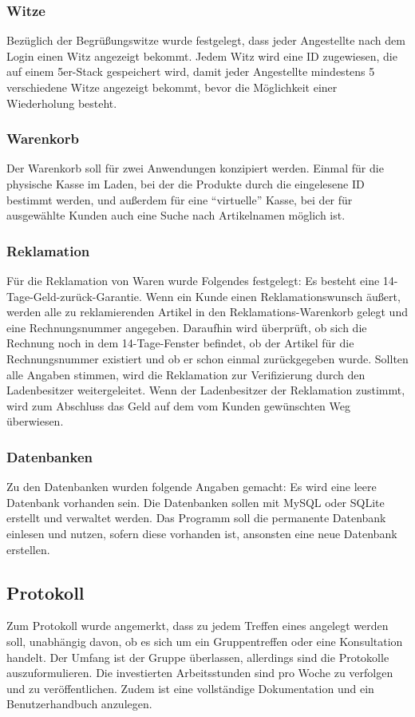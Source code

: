\documentclass{scrartcl}
\begin{document}
\subsubsection{Witze}
Bezüglich der Begrüßungswitze wurde festgelegt, dass jeder Angestellte nach dem Login einen Witz angezeigt bekommt. Jedem Witz wird eine ID zugewiesen, die auf einem 5er-Stack gespeichert wird, damit jeder Angestellte mindestens 5 verschiedene Witze angezeigt bekommt, bevor die Möglichkeit einer Wiederholung besteht.
\subsubsection{Warenkorb}
Der Warenkorb soll für zwei Anwendungen konzipiert werden. Einmal für die physische Kasse im Laden, bei der die Produkte durch die eingelesene ID bestimmt werden, und außerdem für eine "`virtuelle"' Kasse, bei der für ausgewählte Kunden auch eine Suche nach Artikelnamen möglich ist.
\subsubsection{Reklamation}
Für die Reklamation von Waren wurde Folgendes festgelegt: Es besteht eine 14-Tage-Geld-zurück-Garantie. Wenn ein Kunde einen Reklamationswunsch äußert, werden alle zu reklamierenden Artikel in den Reklamations-Warenkorb gelegt und eine Rechnungsnummer angegeben. Daraufhin wird überprüft, ob sich die Rechnung noch in dem 14-Tage-Fenster befindet, ob der Artikel für die Rechnungsnummer existiert und ob er schon einmal zurückgegeben wurde. Sollten alle Angaben stimmen, wird die Reklamation zur Verifizierung durch den Ladenbesitzer weitergeleitet. Wenn der Ladenbesitzer der Reklamation zustimmt, wird zum Abschluss das Geld auf dem vom Kunden gewünschten Weg überwiesen.
\subsubsection{Datenbanken}
Zu den Datenbanken wurden folgende Angaben gemacht: Es wird eine leere Datenbank vorhanden sein. Die Datenbanken sollen mit MySQL oder SQLite erstellt und verwaltet werden. Das Programm soll die permanente Datenbank einlesen und nutzen, sofern diese vorhanden ist, ansonsten eine neue Datenbank erstellen.
\subsection{Protokoll}
Zum Protokoll wurde angemerkt, dass zu jedem Treffen eines angelegt werden soll, unabhängig davon, ob es sich um ein Gruppentreffen oder eine Konsultation handelt. Der Umfang ist der Gruppe überlassen, allerdings sind die Protokolle auszuformulieren. Die investierten Arbeitsstunden sind pro Woche zu verfolgen und zu veröffentlichen. Zudem ist eine vollständige Dokumentation und ein Benutzerhandbuch anzulegen.
\end{document}
